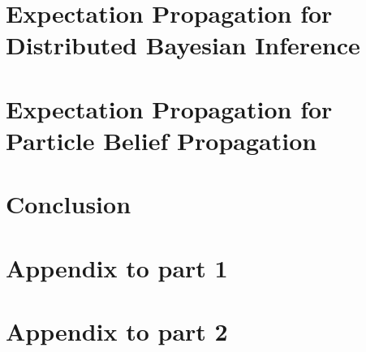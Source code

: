 \ifbgm\fi

\chapter[EP for Distributed Bayesian Inference]{\label{chap:EPforDBI}Expectation Propagation for\\ Distributed Bayesian Inference}
\ifsnep\fi

\chapter[EPBP]{Expectation Propagation for\\ Particle Belief Propagation}

\ifpbp\fi


\chapter{Conclusion}




\begin{appendices}
\chapter{Appendix to part 1}


\chapter{Appendix to part 2}
\end{appendices}



\newpage
\renewcommand{\bibname}{References}

\singlespacing
\begin{footnotesize}

\end{footnotesize}


